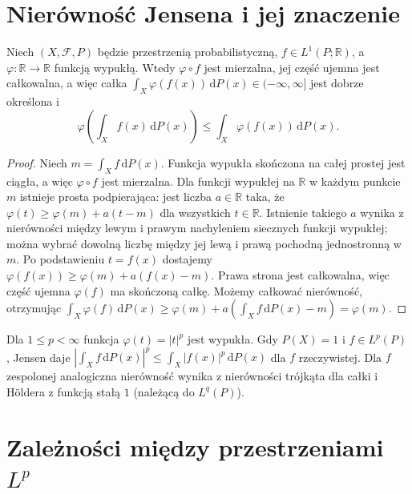 \section{Nierówność Jensena i jej znaczenie}
\begin{twierdzenie}
\label{thm:jensen-14}
Niech $(X,\mathcal F,P)$ będzie przestrzenią
probabilistyczną, $f\in L^1(P;\mathbb R)$,
a $\varphi:\mathbb R\to\mathbb R$ funkcją wypukłą.
Wtedy $\varphi\circ f$ jest mierzalna, jej część ujemna
jest całkowalna, a więc całka
$\int_X\varphi(f(x))\,\mathrm dP(x)\in(-\infty,\infty]$
jest dobrze określona i
\begin{equation}\label{eq:jensen-14}
\varphi\left(\int_Xf(x)\,\mathrm dP(x)\right)
\le\int_X\varphi(f(x))\,\mathrm dP(x).
\end{equation}
\end{twierdzenie}
\begin{proof}
Niech $m=\int_Xf\,\mathrm dP(x)$.
Funkcja wypukła skończona na całej prostej jest ciągła,
a więc $\varphi\circ f$ jest mierzalna.
Dla funkcji wypukłej na $\mathbb R$ w każdym punkcie $m$
istnieje prosta podpierająca: jest liczba $a\in\mathbb R$
taka, że $\varphi(t)\ge\varphi(m)+a(t-m)$
dla wszystkich $t\in\mathbb R$.
Istnienie takiego $a$ wynika z nierówności między
lewym i prawym nachyleniem siecznych funkcji wypukłej;
można wybrać dowolną liczbę między jej lewą
i prawą pochodną jednostronną w $m$.
Po podstawieniu $t=f(x)$ dostajemy
$\varphi(f(x))\ge\varphi(m)+a(f(x)-m)$.
Prawa strona jest całkowalna, więc część ujemna
$\varphi(f)$ ma skończoną całkę. Możemy całkować
nierówność, otrzymując
$\int_X\varphi(f)\,\mathrm dP(x)
\ge\varphi(m)+a(\int_Xf\,\mathrm dP(x)-m)=\varphi(m)$.
\end{proof}

\begin{przyklad}
Dla $1\le p<\infty$ funkcja $\varphi(t)=|t|^p$
jest wypukła. Gdy $P(X)=1$ i $f\in L^p(P)$,
Jensen daje
$|\int_X f\,\mathrm dP(x)|^p\le
\int_X|f(x)|^p\,\mathrm dP(x)$ dla $f$ rzeczywistej.
Dla $f$ zespolonej analogiczna nierówność wynika
z nierówności trójkąta dla całki i Höldera
z funkcją stałą $1$ (należącą do $L^q(P)$).
\end{przyklad}

\section{Zależności między przestrzeniami \texorpdfstring{$L^p$}{L\string^p}}

